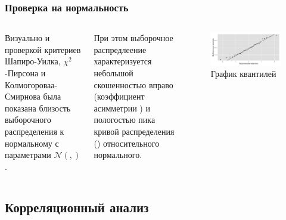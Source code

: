 \documentclass[10pt,pdf,aspectratio=169,hyperref={unicode}]{beamer}
\newcommand{\inp}[1]{}
\newcommand{\descriptive}[2]{\inp{#1/descriptive/#2}}
\newcommand{\normaldistr}{$\mathcal{N}(\descriptive{original}{mean}, \descriptive{original}{variance})$}
\begin{document}
\begin{frame}
  \frametitle{Проверка на нормальность}
  \begin{columns}[c]
  \column{2in}
  Визуально и проверкой критериев Шапиро-Уилка, $\chi^2$-Пирсона и Колмогороваа-Смирнова была показана близость выборочного распределения к нормальному с параметрами \normaldistr.

  \vspace{0.5em}

  При этом выборочное распредлеение характеризуется небольшой скошенностью вправо (коэффициент асимметрии $ \descriptive{original}{skew} $) и пологостью пика кривой распределения ($ \descriptive{original}{kurtosis} $) относительного нормального.
  \column{4in}
  \begin{figure}[h]
    \includegraphics[width=1\linewidth]{../../figures/original/quantile.png}
    \caption{График квантилей}
  \end{figure}
  \end{columns}
\end{frame}

\subsection{Корреляционный анализ}
\end{document}
